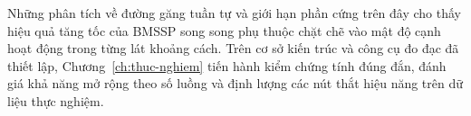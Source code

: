 Những phân tích về đường găng tuần tự và giới hạn phần cứng trên đây cho thấy hiệu quả tăng tốc của BMSSP song song phụ thuộc chặt chẽ vào mật độ cạnh hoạt động trong từng lát khoảng cách. Trên cơ sở kiến trúc và công cụ đo đạc đã thiết lập, Chương~\ref{ch:thuc-nghiem} tiến hành kiểm chứng tính đúng đắn, đánh giá khả năng mở rộng theo số luồng và định lượng các nút thắt hiệu năng trên dữ liệu thực nghiệm.